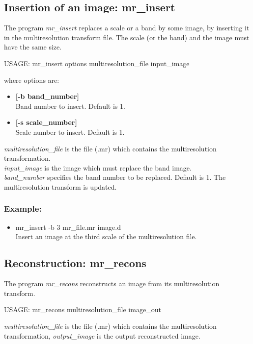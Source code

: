 \subsection{Insertion of an image: mr\_insert}
The program
{\em mr\_insert} replaces a scale or a band by some image, by inserting it
in the multiresolution transform file. The scale (or the band) and the image
must have the same size. 

{\bf \begin{center}
 USAGE: mr\_insert options multiresolution\_file input\_image
\end{center}}
where options are:
\begin{itemize}
\baselineskip=0.4truecm
\itemsep=0.1truecm
\item  {\bf  [-b band\_number] } \\
 Band number to insert. Default is 1.
\item  {\bf  [-s scale\_number] } \\
 Scale number to insert. Default is 1.
\end{itemize}
 {\em multiresolution\_file} is the file (.mr) which contains 
the multiresolution transformation. \\
 {\em input\_image} is the image
which must replace the band image. \\
 {\em band\_number} specifies
the band number to be replaced. Default is 1.  
The multiresolution transform is updated. \\
\subsubsection*{Example:}
\begin{itemize}
\baselineskip=0.4truecm
\itemsep=0.1truecm
\item mr\_insert -b 3 mr\_file.mr image.d \\
Insert an image at the third scale of the multiresolution file. 
\end{itemize}

\subsection{Reconstruction: mr\_recons}
The program 
{\em mr\_recons}  reconstructs an image from its multiresolution
transform.
{\bf 
\begin{center}
 USAGE: mr\_recons  multiresolution\_file  image\_out
\end{center}}
{\em multiresolution\_file} is the file (.mr) which contains 
the multiresolution transformation, {\em output\_image} is  the
output reconstructed image.

